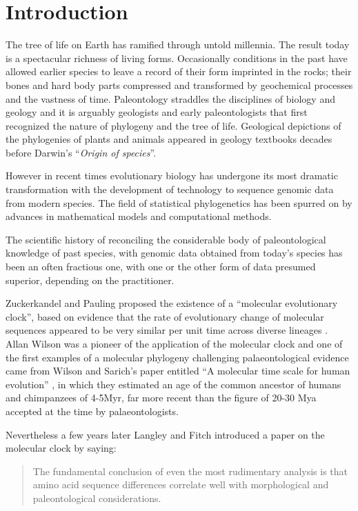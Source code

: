 \section{Introduction} 

The tree of life on Earth has ramified through untold millennia. The result today is a spectacular richness of living forms. Occasionally conditions in the past have allowed earlier species to leave a record of their form imprinted in the rocks; their bones and hard body parts compressed and transformed by geochemical processes and the vastness of time. Paleontology straddles the disciplines of biology and geology and it is arguably geologists and early paleontologists that first recognized the nature of phylogeny and the tree of life. Geological depictions of the phylogenies of plants and animals appeared in geology textbooks decades before Darwin's ``{\em Origin of species}''.

However in recent times evolutionary biology has undergone its most dramatic transformation with the development of technology to sequence genomic data from modern species. The field of statistical phylogenetics has been spurred on by advances in mathematical models and computational methods.

The scientific history of reconciling the considerable body of paleontological knowledge of past species, with genomic data obtained from today's species has been an often fractious one, with one or the other form of data presumed superior, depending on the practitioner.

Zuckerkandel and Pauling proposed the existence of a ``molecular evolutionary clock'', based on evidence that the rate of evolutionary change of molecular sequences appeared to be very similar per unit time across diverse lineages \cite{zuckerkandl1965}. Allan Wilson was a pioneer of the application of the molecular clock and one of the first examples of a molecular phylogeny challenging palaeontological evidence came from Wilson and Sarich's paper entitled ``A molecular time scale for human evolution'' \cite{WilsonSarich1969}, in which they estimated an age of the common ancestor of humans and chimpanzees of 4-5Myr, far more recent than the figure of 20-30 Mya accepted at the time by palaeontologists.

Nevertheless a few years later Langley and Fitch \cite{LangleyFitch1974} introduced a paper on the molecular clock by saying:

\begin{quotation}
The fundamental conclusion of even the most rudimentary analysis is that amino acid sequence differences correlate well with morphological and paleontological considerations.
\end{quotation}


